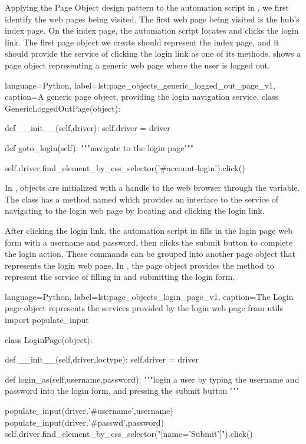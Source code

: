 Applying the Page Object design pattern to the automation script in
, we first identify the web pages
being visited.  The first web page being visited is the hub's index page. On
the index page, the automation script locates and clicks the login link. The
first page object we create should represent the index page, and it should
provide the service of clicking the login link as one of its methods.
 shows a page object representing a
generic web page where the user is logged out.

\begin{xcode}{%
  language=Python,%
  label=lst:page_objects_generic_logged_out_page_v1,%
  caption={A generic page object, providing the login navigation service.}%
}
class GenericLoggedOutPage(object):

  def __init__(self,driver):
    self.driver = driver

  def goto_login(self):
    """navigate to the login page"""

    self.driver.find_element_by_css_selector('#account-login').click()
\end{xcode}

\noindent

In ,
 objects are initialized with a handle to the web
browser through the  variable. The class has a method named
 which provides an interface to the service of navigating
to the login web page by locating and clicking the login link.

After clicking the login link, the automation script in
 fills in the login page web form
with a username and password, then clicks the submit button to complete the login
action. These commands can be grouped into another page object that represents
the login web page. In , the
 page object provides the  method to
represent the service of filling in and submitting the login form.

\begin{xcode}{%
  language=Python,%
  label=lst:page_objects_login_page_v1,%
  caption={The Login page object represents the services provided by the login web page}%
}
from utils import populate_input

class LoginPage(object):

  def __init__(self,driver,loctype):
    self.driver = driver

  def login_as(self,username,password):
    """login a user by typing the username and password
       into the login form, and pressing the submit button
    """

    populate_input(driver,'#username',username)
    populate_input(driver,'#passwd',password)
    self.driver.find_element_by_css_selector("[name='Submit']").click()
\end{xcode}



